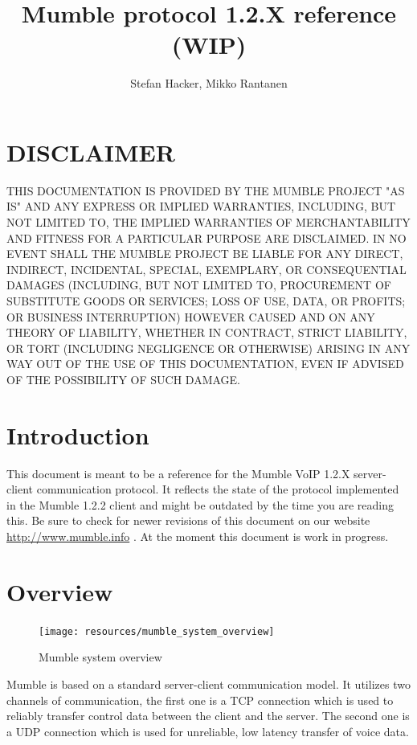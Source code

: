 \documentclass[11pt]{article} %
\title{Mumble protocol 1.2.X reference (WIP)}
\author{Stefan Hacker, Mikko Rantanen}
\begin{document}
\maketitle

\newpage
\section*{DISCLAIMER}

THIS DOCUMENTATION IS PROVIDED BY THE MUMBLE PROJECT "AS IS" AND ANY EXPRESS OR IMPLIED WARRANTIES, INCLUDING, BUT NOT LIMITED TO, THE IMPLIED WARRANTIES OF MERCHANTABILITY AND FITNESS FOR A PARTICULAR PURPOSE ARE DISCLAIMED. IN NO EVENT SHALL THE MUMBLE PROJECT BE LIABLE FOR ANY DIRECT, INDIRECT, INCIDENTAL, SPECIAL, EXEMPLARY, OR CONSEQUENTIAL DAMAGES (INCLUDING, BUT NOT LIMITED TO, PROCUREMENT OF SUBSTITUTE GOODS OR SERVICES; LOSS OF USE, DATA, OR PROFITS; OR BUSINESS INTERRUPTION) HOWEVER CAUSED AND ON ANY THEORY OF LIABILITY, WHETHER IN CONTRACT, STRICT LIABILITY, OR TORT (INCLUDING NEGLIGENCE OR OTHERWISE) ARISING IN ANY WAY OUT OF THE USE OF THIS DOCUMENTATION, EVEN IF ADVISED OF THE POSSIBILITY OF SUCH DAMAGE. 

\tableofcontents
\newpage

\section{Introduction}
This document is meant to be a reference for the Mumble VoIP 1.2.X server-client communication protocol. It reflects the state of the protocol implemented in the Mumble 1.2.2 client and might be outdated by the time you are reading this. Be sure to check for newer revisions of this document on our website \url{http://www.mumble.info} . At the moment this document is work in progress.

\section{Overview}

\begin{figure}[ht]
	\centering
	\texttt{[image: resources/mumble\_system\_overview]}
	\caption{Mumble system overview}
	\label{fig:mumble_system_overview}
\end{figure}

Mumble is based on a standard server-client communication model. It utilizes two channels of communication, the first one is a TCP connection which is used to reliably transfer control data between the client and the server. The second one is a UDP connection which is used for unreliable, low latency transfer of voice data.
\end{document}
